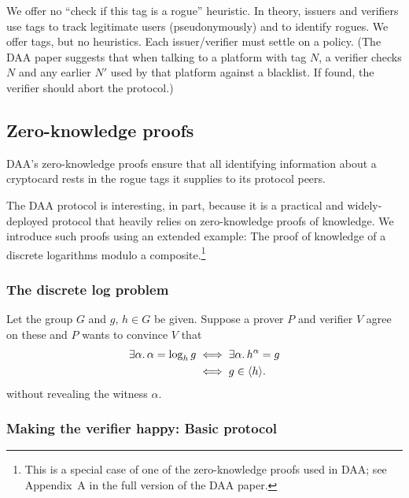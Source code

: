 We offer no “check if this tag is a rogue” heuristic. In
theory, issuers and verifiers use tags to track legitimate
users (pseudonymously) and to identify rogues. We offer tags,
but no heuristics. Each issuer/verifier must settle on a
policy. (The DAA paper suggests that when talking to a
platform with tag $N$, a verifier checks $N$ and any earlier $N'$
used by that platform against a blacklist. If found, the
verifier should abort the protocol.)

\subsection{Zero-knowledge proofs}

\begin{comment}
	\emph{PDS:}
	Security property:  Unforgeability (by reduction to the
	flexible RSA problem).

	Alleged security properties: Satistical witness
	indistinguishable and soundness (by reduction to the flexible
	RSA problem in the random oracle model).
\end{comment}

DAA's zero-knowledge proofs ensure that all identifying information
about a cryptocard rests in the rogue tags it supplies to its protocol peers.

The DAA protocol is interesting, in part, because it is a practical
and widely-deployed protocol that heavily relies on zero-knowledge
proofs of knowledge.
We introduce such proofs using an extended example: The
proof of knowledge of a discrete logarithms modulo a
composite.\footnote{%
	This is a special case of one of the zero-knowledge proofs used in DAA;
	see Appendix~A in the full version of the DAA paper.}

\subsubsection{The discrete log problem}

Let the group $G$ and $g$, $h \in G$ be given.
Suppose a prover $P$ and
verifier $V$ agree on these and $P$ wants to convince $V$ that
\begin{align*}
\exists \alpha.\, \alpha = \log_h g &\iff \exists \alpha.\, h^\alpha = g \\
	&\iff g \in \langle{h}\rangle.
\end{align*}
without revealing the witness $\alpha$.

\subsubsection{Making the verifier happy: Basic protocol}

